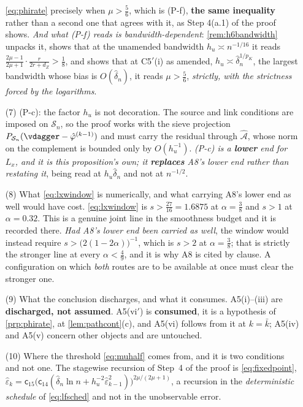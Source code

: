 \begin{remark}
\begin{enumerate}
{\eqref{eq:phirate} precisely when $\mu>\tfrac56$, which is (P-f), \textbf{the same inequality} rather
than a second one that agrees with it}, as Step 4(a.1) of the proof shows. \emph{And what (P-f) reads is
bandwidth-dependent}: \cref{rem:h6bandwidth} unpacks it, shows that at the unamended bandwidth
$h_u\asymp n^{-1/16}$ it reads
$\tfrac{2\mu-1}{2\mu+1}\cdot\tfrac{r}{2r+d_Z}>\tfrac18$, and shows that at C5$'$(i) as amended, 
$h_u\asymp\hat\delta_n^{1/p_K}$, the largest bandwidth whose bias is $O(\hat\delta_n)$, it reads
$\mu>\tfrac56$, \emph{strictly, with the strictness forced by the logarithms}.
\item[(7)] \textup{(P-c)}: the factor $h_u$ is not decoration. The source and link conditions are
imposed on $\mathcal S_n$, so the proof works with the sieve projection
$P_{\mathcal S_n}(\vdagger-\hat\varphi^{(k-1)})$ and must carry the residual through
$\hat{\mathcal A}$, whose norm on the complement is bounded only by $O(h_u^{-1})$. \emph{(P-c) is a
\textbf{lower} end for $L_x$, and it is this proposition's own; it \textbf{replaces} A8's lower end
rather than restating it}, being read at $h_u\hat\delta_n$ and not at $n^{-1/2}$.
\item[(8)] What \eqref{eq:lxwindow} is numerically, and what carrying A8's lower end as well would
have cost. \eqref{eq:lxwindow} is $s>\tfrac{27}{16}=1.6875$ at $\alpha=\tfrac38$ and $s>1$ at
$\alpha=0.32$. This is a genuine joint line in the smoothness budget and it is recorded there.
\emph{Had A8's lower end been carried as well}, the window would instead require
$s>\big(2(1-2\alpha)\big)^{-1}$, which is $s>2$ at $\alpha=\tfrac38$; that is strictly the stronger line
at every $\alpha<\tfrac49$, and it is why A8 is cited by clause. A configuration on which \emph{both}
routes are to be available at once must clear the stronger one.
\item[(9)] What the conclusion discharges, and what it consumes. A5(i)--(iii) are
\textbf{discharged, not assumed}. A5(vi$'$) is \textbf{consumed}, it is a hypothesis of
\cref{prp:phirate}, at \cref{lem:pathcont}(c), and A5(vi) follows from it at $k=\bar k$; A5(iv) and
A5(v) concern other objects and are untouched.
\item[(10)] Where the threshold \eqref{eq:muhalf} comes from, and it is two conditions and not
one. The stagewise recursion of Step~4 of the proof is \eqref{eq:fixedpoint},
$\hat\varepsilon_k=\mathsf c_{15}\big(\mathsf c_{14}(\hat\delta_n\ln n+h_u^{-2}\hat\varepsilon_{k-1}^{2})\big)^{2\mu/(2\mu+1)}$,
a recursion in the \emph{deterministic schedule} of \eqref{eq:lfsched} and not in the unobservable error.

\end{enumerate}
\end{remark}
